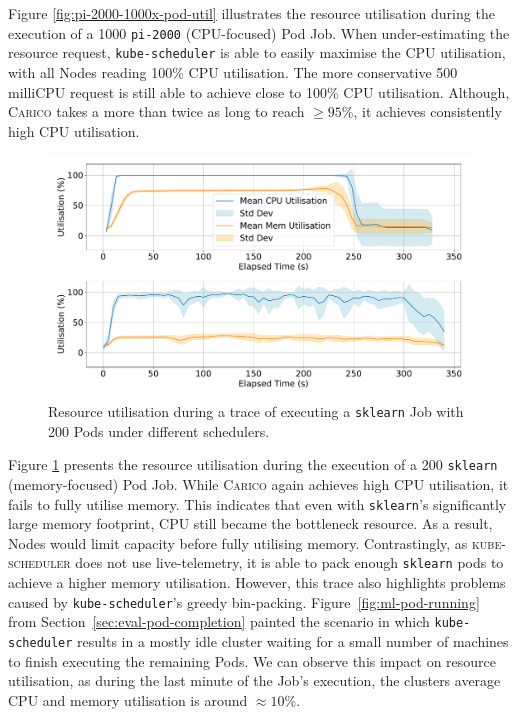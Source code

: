 Figure \ref{fig:pi-2000-1000x-pod-util} illustrates the resource utilisation
during the execution of a 1000 \texttt{pi-2000} (CPU-focused) Pod Job. When
under-estimating the resource request, \texttt{kube-scheduler} is able to easily
maximise the CPU utilisation, with all Nodes reading 100\% CPU utilisation. The
more conservative 500 milliCPU request is still able to achieve close to 100\%
CPU utilisation. Although, \textsc{Carico} takes a more than twice as long to
reach $\geq 95$\%, it achieves consistently high CPU utilisation.

\begin{figure}[ht!]
    \centering
    \includegraphics[width=\textwidth]{images/ml-util.pdf}
    \caption{Resource utilisation during a trace of executing a \texttt{sklearn}
    Job with 200 Pods under different schedulers.}
    \label{fig:ml-util}
\end{figure}

Figure \ref{fig:ml-util} presents the resource utilisation during the execution
of a 200 \texttt{sklearn} (memory-focused) Pod Job. While \textsc{Carico} again
achieves high CPU utilisation, it fails to fully utilise memory. This indicates
that even with \texttt{sklearn}'s significantly large memory footprint, CPU
still became the bottleneck resource. As a result, Nodes would limit capacity
before fully utilising memory. Contrastingly, as \textsc{kube-scheduler} does
not use live-telemetry, it is able to pack enough \texttt{sklearn} pods to
achieve a higher memory utilisation. However, this trace also highlights
problems caused by \texttt{kube-scheduler}'s greedy bin-packing.
Figure~\ref{fig:ml-pod-running} from Section~\ref{sec:eval-pod-completion}
painted the scenario in which \texttt{kube-scheduler} results in a mostly idle
cluster waiting for a small number of machines to finish executing the remaining
Pods. We can observe this impact on resource utilisation, as during the last
minute of the Job's execution, the clusters average CPU and memory utilisation
is around $\approx 10$\%.

